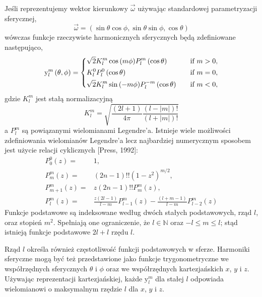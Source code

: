 \documentclass[polish]{article}
\numberwithin{equation}{section}
\begin{document}
Jeśli reprezentujemy wektor kierunkowy $\vec{\omega}$ używając standardowej parametryzacji sferycznej,
\begin{equation}
\vec{\omega}=\left(\sin\theta \cos\phi, \sin\theta \sin\phi, \cos\theta\right)
\end{equation}
wówczas funkcje rzeczywiste harmonicznych sferycznych będą zdefiniowane następująco,
\begin{equation}
\mathrm{y}^{m}_{l}\left(\theta,\phi\right)=
\begin{dcases}
\sqrt{2}K^{m}_{l}\cos{\left(m\phi\right)}P^{m}_{l}\left(\cos\theta\right) & \quad \text{if } m>0,\\
K^{0}_{l}P^{0}_{l}\left(\cos\theta\right) & \quad \text{if } m=0,\\
\sqrt{2}K^{m}_{l}\sin{\left(-m\phi\right)}P^{-m}_{l}\left(\cos\theta\right) & \quad \text{if } m<0,
\end{dcases}
\end{equation}
gdzie $K^{m}_{l}$ jest stałą normalizacyjną
\begin{equation}
K^{m}_{l}=\sqrt{\frac{\left(2l+1\right)}{4\pi}\frac{\left(l-|m|\right)!}{\left(l+|m|\right)!}}
\end{equation}
a $P^{m}_{l}$ są powiązanymi wielomianami Legendre'a. Istnieje wiele możliwości zdefiniowania wielomianów Legendre'a lecz najbardziej numerycznym sposobem jest użycie relacji cyklicznych [Press, 1992]:
\begin{align}
P^{0}_{0}(z)=& 1, \\
P^{m}_{m}(z)=& (2n-1)!!(1-z^{2})^{m/2}, \\
P^{m}_{m+1}(z)=& z(2n-1)!!P^{m}_{m}(z), \\
P^{m}_{l}(z)=& \frac{z(2l-1)}{l-m}P^{m}_{l-1}(z)-\frac{(l+m-1)}{l-m}P^{m}_{l-2}(z)
\end{align}
Funkcje podstawowe są indeksowane według dwóch stałych podstawowych, rząd $l$, oraz stopień $m^2$. Spełniają one ograniczenie, że $l\in\mathbb{N}$ oraz $-l\le m\le l$; stąd istnieją funkcje podstawowe $2l+l$ rzędu $l$.

Rząd $l$ określa również częstotliwość funkcji podstawowych w sferze. Harmoniki sferyczne mogą być też przedstawione jako funkcje trygonometryczne we współrzędnych sferycznych $\theta$ i $\phi$ oraz we współrzędnych kartezjańskich $x$, $y$ i $z$. Używając reprezentacji kartezjańskiej, każde $\mathrm{y}^{m}_{l}$ dla stałej $l$ odpowiada wielomianowi o maksymalnym rzędzie $l$ dla $x$, $y$ i $z$. \\
\end{document}

